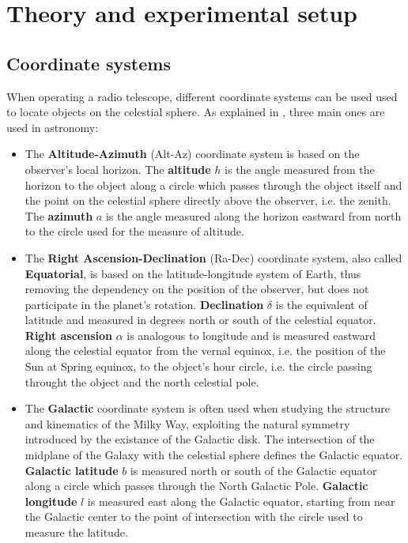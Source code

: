 \section{Theory and experimental setup}
\subsection{Coordinate systems}
When operating a radio telescope, different coordinate systems can be used used to locate objects on the celestial sphere.
As explained in \cite{carroll_introduction_2007}, three main ones are used in astronomy:
\begin{itemize}
    \item The \textbf{Altitude-Azimuth} (Alt-Az) coordinate system is based on the observer's local horizon. The \textbf{altitude} $h$ is the angle measured from the horizon to the object along a circle which passes through the object itself and the point on the celestial sphere directly above the observer, i.e. the zenith. The \textbf{azimuth} $a$ is the angle measured along the horizon eastward from north to the circle used for the measure of altitude.
    \item The \textbf{Right Ascension-Declination} (Ra-Dec) coordinate system, also called \textbf{Equatorial}, is based on the latitude-longitude system of Earth, thus removing the dependency on the position of the observer, but does not participate in the planet's rotation. \textbf{Declination} $\delta$ is the equivalent of latitude and measured in degrees north or south of the celestial equator. \textbf{Right ascension} $\alpha$ is analogous to longitude and is measured eastward along the celestial equator from the vernal equinox, i.e. the position of the Sun at Spring equinox, to the object's hour circle, i.e. the circle passing throught the object and the north celestial pole.
    \item The \textbf{Galactic} coordinate system is often used when studying the structure and kinematics of the Milky Way, exploiting the natural symmetry introduced by the existance of the Galactic disk. The intersection of the midplane of the Galaxy with the celestial sphere defines the Galactic equator. \textbf{Galactic latitude} $b$ is measured north or south of the Galactic equator along a circle which passes through the North Galactic Pole. \textbf{Galactic longitude} $l$ is measured east along the Galactic equator, starting from near the Galactic center to the point of intersection with the circle used to measure the latitude.
\end{itemize}
